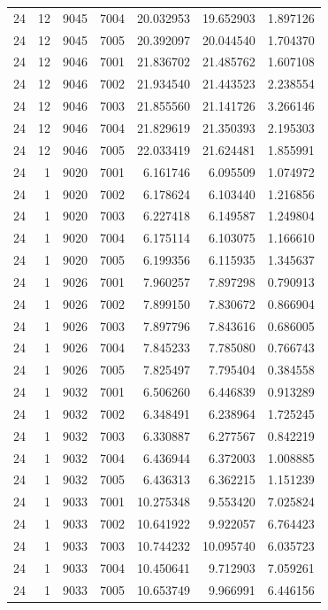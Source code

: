 \begin{table}
\begin{tabular}{rrrrrrr}
24 & 12 & 9045 & 7004 & 20.032953 & 19.652903 & 1.897126 \\
24 & 12 & 9045 & 7005 & 20.392097 & 20.044540 & 1.704370 \\
24 & 12 & 9046 & 7001 & 21.836702 & 21.485762 & 1.607108 \\
24 & 12 & 9046 & 7002 & 21.934540 & 21.443523 & 2.238554 \\
24 & 12 & 9046 & 7003 & 21.855560 & 21.141726 & 3.266146 \\
24 & 12 & 9046 & 7004 & 21.829619 & 21.350393 & 2.195303 \\
24 & 12 & 9046 & 7005 & 22.033419 & 21.624481 & 1.855991 \\
24 & 1 & 9020 & 7001 & 6.161746 & 6.095509 & 1.074972 \\
24 & 1 & 9020 & 7002 & 6.178624 & 6.103440 & 1.216856 \\
24 & 1 & 9020 & 7003 & 6.227418 & 6.149587 & 1.249804 \\
24 & 1 & 9020 & 7004 & 6.175114 & 6.103075 & 1.166610 \\
24 & 1 & 9020 & 7005 & 6.199356 & 6.115935 & 1.345637 \\
24 & 1 & 9026 & 7001 & 7.960257 & 7.897298 & 0.790913 \\
24 & 1 & 9026 & 7002 & 7.899150 & 7.830672 & 0.866904 \\
24 & 1 & 9026 & 7003 & 7.897796 & 7.843616 & 0.686005 \\
24 & 1 & 9026 & 7004 & 7.845233 & 7.785080 & 0.766743 \\
24 & 1 & 9026 & 7005 & 7.825497 & 7.795404 & 0.384558 \\
24 & 1 & 9032 & 7001 & 6.506260 & 6.446839 & 0.913289 \\
24 & 1 & 9032 & 7002 & 6.348491 & 6.238964 & 1.725245 \\
24 & 1 & 9032 & 7003 & 6.330887 & 6.277567 & 0.842219 \\
24 & 1 & 9032 & 7004 & 6.436944 & 6.372003 & 1.008885 \\
24 & 1 & 9032 & 7005 & 6.436313 & 6.362215 & 1.151239 \\
24 & 1 & 9033 & 7001 & 10.275348 & 9.553420 & 7.025824 \\
24 & 1 & 9033 & 7002 & 10.641922 & 9.922057 & 6.764423 \\
24 & 1 & 9033 & 7003 & 10.744232 & 10.095740 & 6.035723 \\
24 & 1 & 9033 & 7004 & 10.450641 & 9.712903 & 7.059261 \\
24 & 1 & 9033 & 7005 & 10.653749 & 9.966991 & 6.446156 \\

\end{tabular}
\end{table}
